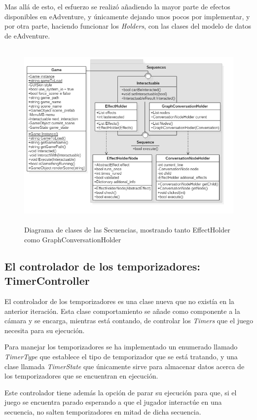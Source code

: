 Mas allá de esto, el esfuerzo se realizó añadiendo la mayor parte de efectos disponibles en eAdventure, y únicamente dejando unos pocos por implementar, y por otra parte, haciendo funcionar los \textit{Holders}, con las clases del modelo de datos de eAdventure.

\begin{figure}[h!]
	\centerline{\includegraphics[height=3.7in]{figures/it2/Sequences.png}}
	\caption[Sequences - Versión Final]{Diagrama de clases de las Secuencias, mostrando tanto EffectHolder como GraphConversationHolder}
	\label{sequencesfigit2}
\end{figure}

\subsection{El controlador de los temporizadores: TimerController}

El controlador de los temporizadores es una clase nueva que no existía en la anterior iteración. Esta clase comportamiento se añade como componente a la cámara y se encarga, mientras está contando, de controlar los \textit{Timers} que el juego necesita para su ejecución.

Para manejar los temporizadores se ha implementado un enumerado llamado \textit{TimerType} que establece el tipo de temporizador que se está tratando, y una clase llamada \textit{TimerState} que únicamente sirve para almacenar datos acerca de los temporizadores que se encuentran en ejecución.

Este controlador tiene además la opción de parar su ejecución para que, si el juego se encuentra parado esperando a que el jugador interactúe en una secuencia, no salten temporizadores en mitad de dicha secuencia. 

